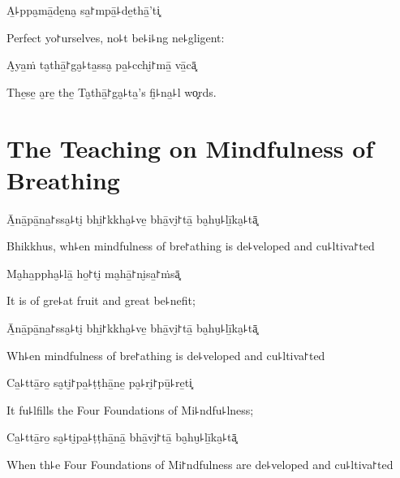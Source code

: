 A̱꜕ppa̮mā̱de̱na̮ sa̱꜓mpā̱꜕de̱thā̱'ti͓

\begin{english}
  Perfect yo꜓urselves, no꜕t be꜕i꜕ng ne꜕gligent:
\end{english}

A̮ya̱ṁ ta̮thā̱꜓ga̮꜕ta̱ssa̮ pa̱꜕cchi̮꜓mā̱ vā̱cā͓

\begin{english}
  The̱se̱ a̮re̱ the̱ Ta̮thā̱꜓ga̮꜕ta̱'s fi̮꜕na̱꜕l wo͓rds.
\end{english}

\chapter{The Teaching on Mindfulness of Breathing}


\begin{leader}
\end{leader}

Ā̱nā̱pā̱na̱꜓ssa̮꜕ti̮ bhi̱꜓kkha̮꜕ve̱ bhā̱vi̮꜓tā̱ ba̮hu̮꜕lī̱ka̮꜕tā͓

\begin{english}
  Bhikkhus, wh꜕en mindfulness of bre꜓athing is de꜕veloped and cu꜕ltiva꜓ted
\end{english}

Ma̮ha̱ppha̮꜕lā̱ ho̱꜓ti̮ ma̮hā̱꜓ni̮sa̱꜓ṁsā͓

\begin{english}
  It is of gre꜕at fruit and great be꜕nefit;
\end{english}

Ā̱nā̱pā̱na̱꜓ssa̮꜕ti̮ bhi̱꜓kkha̮꜕ve̱ bhā̱vi̮꜓tā̱ ba̮hu̮꜕lī̱ka̮꜕tā͓

\begin{english}
  Wh꜕en mindfulness of bre꜓athing is de꜕veloped and cu꜕ltiva꜓ted
\end{english}

Ca̱꜕ttā̱ro̱ sa̮ti̮꜓pa̱꜕ṭṭhā̱ne̱ pa̮꜕ri̮꜓pū̱꜕re̱ti͓

\begin{english}
  It fu꜕lfills the Four Foundations of Mi꜕ndfu꜕lness;
\end{english}

Ca̱꜕ttā̱ro̱ sa̮꜕ti̮pa̱꜕ṭṭhā̱nā̱ bhā̱vi̮꜓tā̱ ba̮hu̮꜕lī̱ka̮꜕tā͓

\begin{english}
  When th꜕e Four Foundations of Mi꜓ndfulness are de꜕veloped and cu꜕ltiva꜓ted
\end{english}

